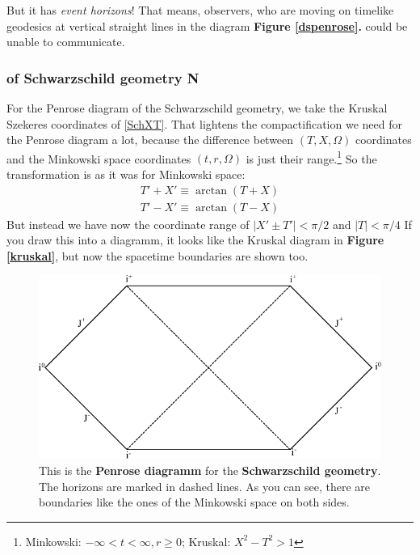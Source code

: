 		But it has \textit{event horizons}! That means, observers, who are moving on timelike geodesics at vertical straight lines in the diagram \textbf{Figure \ref{dspenrose}.} could be unable to communicate.
	 
	\subsubsection{of Schwarzschild geometry \textbf{N}}
	
	For the Penrose diagram of the Schwarzschild geometry, we take the Kruskal Szekeres coordinates of \eqref{SchXT}. That lightens the compactification we need for the Penrose diagram a lot, because the difference between $(T,X,\Omega)$ coordinates and the Minkowski space coordinates $(t,r,\Omega)$ is just their range.\footnote{Minkowski: $-\infty < t < \infty, r\geq 0$; Kruskal: $X^2-T^2 > 1$}
	So the transformation is as it was for Minkowski space:
		\begin{equation}
			\begin{split}
			T'+X'\equiv \arctan(T+X) \\
			T'-X'\equiv \arctan(T-X)
			\end{split}		
		\end{equation}
	But instead we have now the coordinate range of $|X'\pm T'|< \pi/2$ and $|T|< \pi/4$ 
	If you draw this into a diagramm, it looks like the Kruskal diagram in \textbf{Figure \ref{kruskal}}, but now the spacetime boundaries are shown too.
		\begin{figure}[tbp]  	
	  	\begin{center}
		\includegraphics[scale=1]{schpenrose}
		\end{center}
		\caption{This is the \textbf{Penrose diagramm} for the \textbf{Schwarzschild geometry}. The horizons are marked in dashed lines. As you can see, there are boundaries like the ones of the Minkowski space on both sides.}
		\end{figure}
	\FloatBarrier

